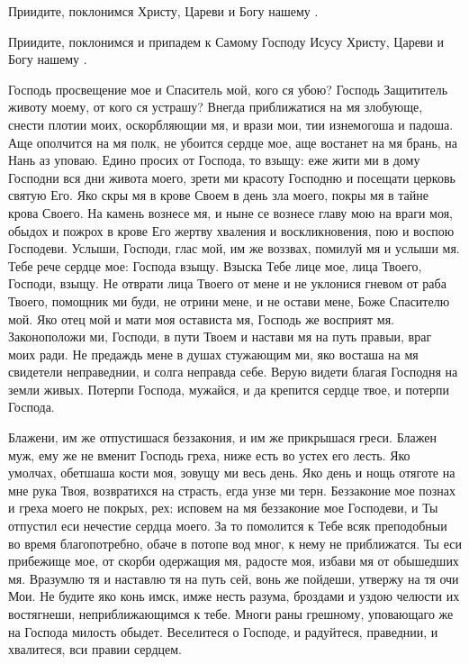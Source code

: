 \begin{mymulticols}
Приидите, поклонимся Христу, Цареви и Богу нашему .

Приидите, поклонимся и припадем к Самому Господу Исусу Христу, Цареви и Богу нашему .




Господь просвещение мое и Спаситель мой, кого ся убою? Господь Защититель животу моему, от кого ся устрашу? Внегда приближатися на мя злобующе, снести плотии моих, оскорбляющии мя, и врази мои, тии изнемогоша и падоша. Аще ополчится на мя полк, не убоится сердце мое, аще востанет на мя брань, на Нань аз уповаю. Едино просих от Господа, то взыщу: еже жити ми в дому Господни вся дни живота моего, зрети ми красоту Господню и посещати церковь святую Его. Яко скры мя в крове Своем в день зла моего, покры мя в тайне крова Своего. На камень вознесе мя, и ныне се вознесе главу мою на враги моя, обыдох и пожрох в крове Его жертву хваления и воскликновения, пою и воспою Господеви. Услыши, Господи, глас мой, им же воззвах, помилуй мя и услыши мя. Тебе рече сердце мое: Господа взыщу. Взыска Тебе лице мое, лица Твоего, Господи, взыщу. Не отврати лица Твоего от мене и не уклонися гневом от раба Твоего, помощник ми буди, не отрини мене, и не остави мене, Боже Спасителю мой. Яко отец мой и мати моя остависта мя, Господь же восприят мя. Законоположи ми, Господи, в пути Твоем и настави мя на путь правыи, враг моих ради. Не предаждь мене в душах стужающим ми, яко восташа на мя свидетели неправеднии, и солга неправда себе. Верую видети благая Господня на земли живых. Потерпи Господа, мужайся, и да крепится сердце твое, и потерпи Господа.



Блажени, им же отпустишася беззакония, и им же прикрышася греси. Блажен муж, ему же не вменит Господь греха, ниже есть во устех его лесть. Яко умолчах, обетшаша кости моя, зовущу ми весь день. Яко день и нощь отяготе на мне рука Твоя, возвратихся на страсть, егда унзе ми терн. Беззаконие мое познах и греха моего не покрых, рех: исповем на мя беззаконие мое Господеви, и Ты отпустил еси нечестие сердца моего. За то помолится к Тебе всяк преподобныи во время благопотребно, обаче в потопе вод мног, к нему не приближатся. Ты еси прибежище мое, от скорби одержащия мя, радосте моя, избави мя от обышедших мя. Вразумлю тя и наставлю тя на путь сей, вонь же пойдеши, утвержу на тя очи Мои. Не будите яко конь имск, имже несть разума, броздами и уздою челюсти их востягнеши, неприближающимся к тебе. Многи раны грешному, уповающаго же на Господа милость обыдет. Веселитеся о Господе, и радуйтеся, праведнии, и хвалитеся, вси правии сердцем.



\end{mymulticols}
